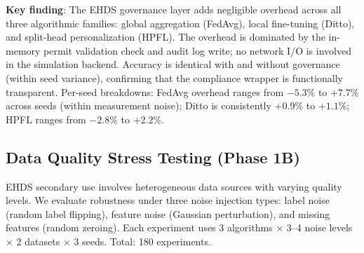 \documentclass[conference]{IEEEtran}
\begin{document}
\textbf{Key finding}: The EHDS governance layer adds negligible overhead across all three algorithmic families: global aggregation (FedAvg), local fine-tuning (Ditto), and split-head personalization (HPFL). The overhead is dominated by the in-memory permit validation check and audit log write; no network I/O is involved in the simulation backend. Accuracy is identical with and without governance (within seed variance), confirming that the compliance wrapper is functionally transparent. Per-seed breakdowns: FedAvg overhead ranges from $-5.3\%$ to $+7.7\%$ across seeds (within measurement noise); Ditto is consistently $+0.9\%$ to $+1.1\%$; HPFL ranges from $-2.8\%$ to $+2.2\%$.

\subsection{Data Quality Stress Testing (Phase 1B)}
\label{sec:data_quality_stress}

EHDS secondary use involves heterogeneous data sources with varying quality levels. We evaluate robustness under three noise injection types: label noise (random label flipping), feature noise (Gaussian perturbation), and missing features (random zeroing). Each experiment uses 3 algorithms $\times$ 3--4 noise levels $\times$ 2 datasets $\times$ 3 seeds. Total: 180 experiments.
\end{document}
